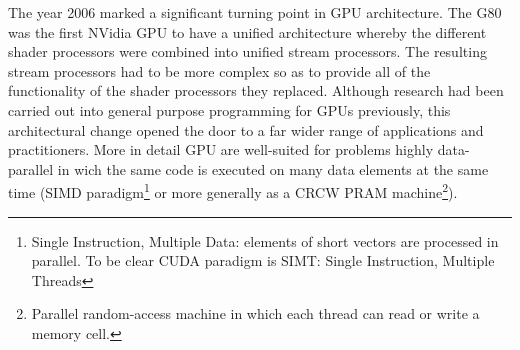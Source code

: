 The year 2006 marked a significant turning point in GPU architecture. The G80
was the first NVidia GPU to have a unified architecture whereby the different shader processors were
combined into unified stream processors. The resulting stream processors had to be
more complex so as to provide all of the functionality of the shader processors they
replaced. Although research had been carried out into general purpose programming
for GPUs previously, this architectural change opened the door to a far wider range of
applications and practitioners.
More in detail GPU are well-suited for problems highly data-parallel in wich the
same code is executed on many data elements at the same time (SIMD
paradigm\footnote{Single Instruction,
Multiple Data:
elements of short vectors are processed in parallel. To be clear CUDA paradigm is SIMT: Single
Instruction, Multiple Threads} or more generally as a CRCW PRAM
machine\footnote{Parallel random-access machine in which each thread can read
or write a memory cell.}).








